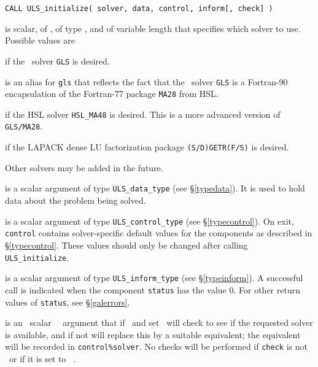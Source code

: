 \documentclass{galahad}
\newcommand{\packagename}{ULS}
\begin{document}
\hskip0.5in
{\tt CALL \packagename\_initialize( solver, data, control, inform[, check] )}
\begin{description}

 is scalar, of \intentin, of type \character, and of variable
length that specifies which solver to use. Possible values are
\begin{description}
 if the \galahad\ solver {\tt GLS} is desired.

 is an alias for {\tt gls} that reflects the fact that the \galahad\
 solver {\tt GLS} is a Fortran-90 encapsulation of the Fortran-77
 package {\tt MA28} from HSL.

 if the HSL solver {\tt HSL\_MA48} is desired. This is a more
advanced version of {\tt GLS/MA28}.

 if the LAPACK dense LU factorization package
{\tt (S/D)GETR(F/S)} is desired.




\end{description}
Other solvers may be added in the future.

 is a scalar \intentout argument of type
{\tt \packagename\_data\_type}
(see \S\ref{typedata}). It is used to hold data about the problem being
solved.

 is a scalar \intentout argument of type
{\tt \packagename\_control\_type}
(see \S\ref{typecontrol}).
On exit, {\tt control} contains solver-specific default values for the
components as described in \S\ref{typecontrol}.
These values should only be changed after calling
{\tt \packagename\_initialize}.

 is a scalar \intentout argument of type
{\tt \packagename\_inform\_type}
(see \S\ref{typeinform}).
A successful call is indicated when the  component {\tt status} has the value 0.
For other return values of {\tt status}, see \S\ref{galerrors}.

 is an \optional\ scalar \logical\ \intentin\ argument
that if \present\ and set \true\ will check to see if the requested solver
is available, and if not will replace this by a suitable equivalent; the
equivalent will be recorded in {\tt control\%solver}.
No checks will be performed if {\tt check} is not \present\ or if it is set
to \false\ .

\end{description}
\end{document}
